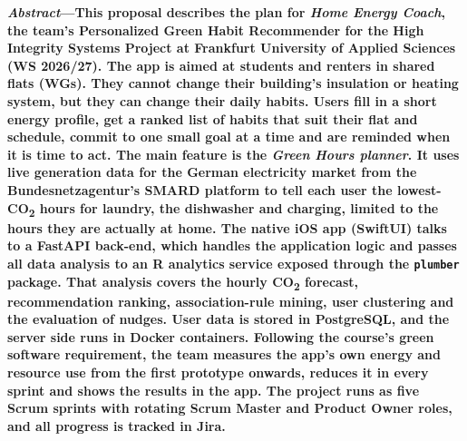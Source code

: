 \documentclass[10pt,twocolumn,letterpaper]{article}
\newcommand{\cotwo}{CO\textsubscript{2}}
\begin{document}
 
{\fontsize{9}{10.5}\selectfont\bfseries\noindent\textit{Abstract}---This proposal describes the plan for \emph{Home Energy Coach}, the team's Personalized Green Habit Recommender for the High Integrity Systems Project at Frankfurt University of Applied Sciences (WS 2026/27). The app is aimed at students and renters in shared flats (WGs). They cannot change their building's insulation or heating system, but they can change their daily habits. Users fill in a short energy profile, get a ranked list of habits that suit their flat and schedule, commit to one small goal at a time and are reminded when it is time to act. The main feature is the \emph{Green Hours planner}. It uses live generation data for the German electricity market from the Bundesnetzagentur's SMARD platform to tell each user the lowest-\cotwo{} hours for laundry, the dishwasher and charging, limited to the hours they are actually at home. The native iOS app (SwiftUI) talks to a FastAPI back-end, which handles the application logic and passes all data analysis to an R analytics service exposed through the \texttt{plumber} package. That analysis covers the hourly \cotwo{} forecast, recommendation ranking, association-rule mining, user clustering and the evaluation of nudges. User data is stored in PostgreSQL, and the server side runs in Docker containers. Following the course's green software requirement, the team measures the app's own energy and resource use from the first prototype onwards, reduces it in every sprint and shows the results in the app. The project runs as five Scrum sprints with rotating Scrum Master and Product Owner roles, and all progress is tracked in Jira.\par}
 
\end{document}
